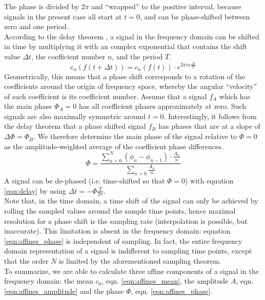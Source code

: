 The phase is divided by $2\pi$ and ``wrapped'' to the positive interval, because signals in the present case all start at $t=0$, and can be phase-shifted between zero and one period.
\\According to the delay theorem \citep[also shift theorem,][p. 111]{Bracewell2000}, a signal in the frequency domain can be shifted in time by multiplying it with an complex exponential that contains the shift value $\Delta t$, the coefficient number $n$, and the period $T$.
\begin{equation}\label{eqn:delay}
  c_{n}\left( f(t+\Delta t)\right) = c_{n}\left( f(t)\right)\cdot e^{2\pi i n \frac{\Delta t}{T}}
\end{equation}
Geometrically, this means that a phase shift corresponds to a rotation of the coefficients around the origin of frequency space, whereby the angular ``velocity'' of each coefficient is its coefficient number.
Assume that a signal $f_{A}$ which has the main phase $\Phi_{A} = 0$ has all coefficient phases approximately at zero.
Such signals are also maximally symmetric around $t=0$.
Interestingly, it follows from the delay theorem that a phase shifted signal $f_{B}$ has phases that are at a slope of $\Delta \Phi = \Phi_{B}$.
We therefore determine the main phase of the signal relative to $\Phi=0$ as the amplitude-weighted average of the coefficient phase differences.
	\begin{equation}\label{eqn:affines_phase}
	\Phi = \frac{\sum_{n>0}^{N} (\phi_{n}-\phi_{n-1})\cdot \frac{A_{n}}{n}}{\sum_{n>0} \frac{A_{n}}{n}}
	\end{equation}
A signal can be de-phased (i.e. time-shifted so that $\Phi=0$) with equation \eqref{eqn:delay} by using $\Delta t = -\Phi \frac{T}{2\pi}$.
\\Note that, in the time domain, a time shift of the signal can only be achieved by rolling the sampled values around the sample time points, hence maximal resolution for a phase shift is the sampling rate (interpolation is possible, but inaccurate).
This limitation is absent in the frequency domain: equation \eqref{eqn:affines_phase} is independent of sampling.
In fact, the entire frequency domain representation of a signal is indifferent to sampling time points, except that the order $N$ is limited by the aforementioned sampling theorem.
\\To summarize, we are able to calculate three affine components of a signal in the frequency domain: the mean $c_{0}$, eqn. \eqref{eqn:affines_mean}, the amplitude $A$, eqn. \eqref{eqn:affines_amplitude} and the phase $\Phi$, eqn. \eqref{eqn:affines_phase}.
